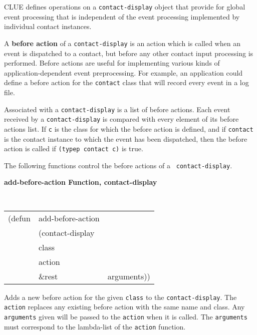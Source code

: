 \documentclass[twoside]{book}
\begin{document}
\begin{sloppy}
CLUE defines operations on a {\tt contact-display} object that provide for global
event processing that is independent of the event processing implemented by individual
contact instances.


A {\bf before action}
 of a {\tt contact-display} is an action which is called
when an event is dispatched to a contact, but before any other contact input
processing is performed. Before actions are useful for implementing
various kinds of application-dependent event preprocessing. For example, an
application could define a before action for the {\tt contact} class that will
record every event in a log file. 

Associated with a {\tt contact-display} is a list of before actions. 
Each event received by a {\tt contact-display} is compared with every element of
its before actions list. If {\tt c} is the class for which the before
action is defined, and if {\tt contact} is the contact instance to which the
event has been dispatched, then the before action is called if {\tt (typep
contact c)} is true.

The following functions control the before actions of a {\tt
contact-display}.

\pagebreak
{\large {\bf add-before-action \hfill Function, contact-display}} 
\begin{flushright} \parbox[t]{6.125in}{
\tt
\begin{tabular}{lll}
\raggedright
(defun & add-before-action & \\ 
& (contact-display\\
& class\\
& action\\
& \&rest & arguments))
\end{tabular}
\rm

}\end{flushright}



\begin{flushright} \parbox[t]{6.125in} { Adds a new before action for the given
{\tt class} to the {\tt contact-display}. The {\tt action} replaces any
existing before action with the same name and class. Any {\tt arguments} given
will be passed to the {\tt action} when it is called. The {\tt arguments} must
correspond to the lambda-list of the {\tt action} function.

}
\end{flushright}
\end{sloppy}
\end{document}

